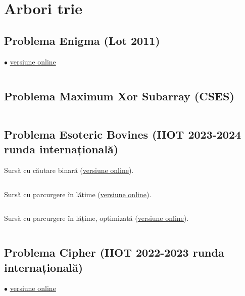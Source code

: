 \documentclass[../main.tex]{subfiles}
\begin{document}
\chapter{Arbori trie}

\section{Problema Enigma (Lot 2011)}
\label{code:enigma}
$\bullet$
\href{https://kilonova.ro/submissions/1117529}{versiune online}

\inputminted{cpp}{../src/strings/enigma.cpp}

\section{Problema Maximum Xor Subarray (CSES)}
\label{code:maximum-xor-subarray}

\inputminted{cpp}{../src/strings/maximum-xor-subarray.cpp}

\section{Problema Esoteric Bovines (IIOT 2023-2024 runda internațională)}
\label{code:esoteric-bovines}

Sursă cu căutare binară (\href{https://kilonova.ro/submissions/1117687}{versiune online}).

\inputminted{cpp}{../src/strings/esoteric-bovines-1.cpp}

Sursă cu parcurgere în lățime (\href{https://kilonova.ro/submissions/1117695}{versiune online}).

\inputminted{cpp}{../src/strings/esoteric-bovines-2.cpp}

Sursă cu parcurgere în lățime, optimizată (\href{https://kilonova.ro/submissions/1117740}{versiune online}).

\inputminted{cpp}{../src/strings/esoteric-bovines-3.cpp}

\section{Problema Cipher (IIOT 2022-2023 runda internațională)}
\label{code:cipher}
$\bullet$
\href{https://kilonova.ro/submissions/1117976}{versiune online}

\inputminted{cpp}{../src/strings/cipher.cpp}
\end{document}
